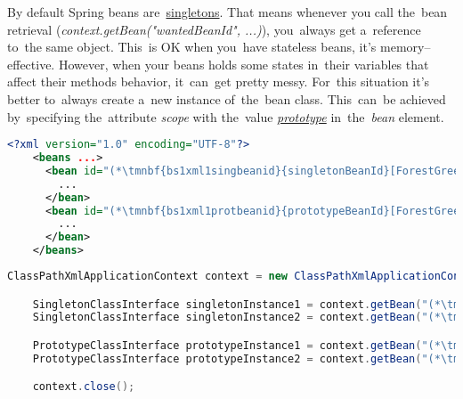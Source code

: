 \label{beanscope}
By default Spring beans are~\hyperref[singletondp]{singletons}.
That means whenever you call the~bean retrieval (\textit{context.getBean("wantedBeanId", ...)}), you~always get a~reference to~the same object.
This~is OK when you~have stateless beans, it's memory--effective.
However, when your beans holds some states in~their variables that affect their methods behavior, it~can~get pretty messy.
For~this situation it's better to~always create a~new instance of~the~bean class.
This~can~be achieved by~specifying the~attribute \textit{scope} with the~value \hyperref[prototypedp]{\textit{prototype}} in~the~\textit{bean} element.

\example
\begin{lstlisting}[language=XML, title={Configuration XML}]
    <?xml version="1.0" encoding="UTF-8"?>
    <beans ...>
      <bean id="(*\tmnbf{bs1xml1singbeanid}{singletonBeanId}[ForestGreen]*)" class="somepackage.subpackage.SingletonClass">
        ...
      </bean>
      <bean id="(*\tmnbf{bs1xml1protbeanid}{prototypeBeanId}[ForestGreen]*)" class="somepackage.subpackage.PrototypeClass" scope="prototype">
        ...
      </bean>
    </beans>
\end{lstlisting}
\begin{lstlisting}[language=Java, title={Usage}]
    ClassPathXmlApplicationContext context = new ClassPathXmlApplicationContext("configurationFile.xml");

    SingletonClassInterface singletonInstance1 = context.getBean("(*\tmnbf{bs1java1singbeanid1}{singletonBeanId}[ForestGreen]*)", SingletonClassInterface.class);
    SingletonClassInterface singletonInstance2 = context.getBean("(*\tmnbf{bs1java1singbeanid2}{singletonBeanId}[ForestGreen]*)", SingletonClassInterface.class);

    PrototypeClassInterface prototypeInstance1 = context.getBean("(*\tmnbf{bs1java1protbeanid1}{prototypeBeanId}[ForestGreen]*)", PrototypeClassInterface.class);
    PrototypeClassInterface prototypeInstance2 = context.getBean("(*\tmnbf{bs1java1protbeanid2}{prototypeBeanId}[ForestGreen]*)", PrototypeClassInterface.class);

    context.close();
\end{lstlisting}

